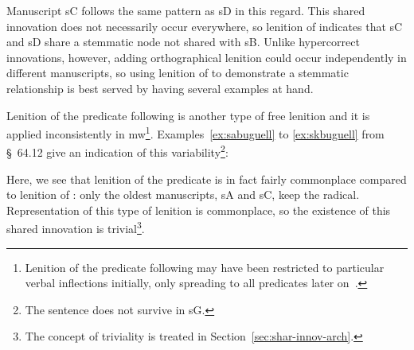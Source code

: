 Manuscript \gls{sC} follows the same pattern as \gls{sD} in this regard. This shared innovation does not necessarily occur everywhere, so lenition of  indicates that  \gls{sC} and \gls{sD} share a stemmatic node not shared with \gls{sB}. Unlike hypercorrect innovations, however, adding orthographical lenition could occur independently in different manuscripts, so using lenition of  to demonstrate a stemmatic relationship is best served by having several examples at hand.


Lenition of the predicate following  is another type of free lenition and it is applied inconsistently in \gls{mw}\footnote{Lenition of the predicate following  may have been restricted to particular verbal inflections initially, only spreading to all predicates later on~\autocite[77]{van_development14}.}. Examples~\ref{ex:sabuguell} to \ref{ex:skbuguell} from  §~64.12 give an indication of this variability\footnote{The sentence does not survive in \gls{sG}.}:
\begin{mwl}
\end{mwl}
Here, we see that lenition of the predicate is in fact fairly commonplace compared to  lenition of : only the oldest manuscripts, \gls{sA} and \gls{sC}, keep the radical. Representation of this type of lenition is commonplace, so the existence of this shared innovation is trivial\footnote{The concept of triviality is treated in Section~\ref{sec:shar-innov-arch}.}.

